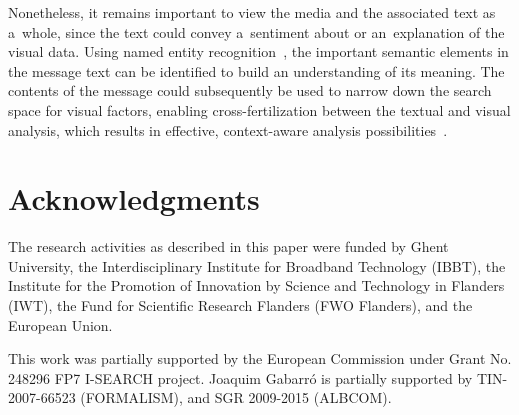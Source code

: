 \documentclass{acm_proc_article-sp}
\newcommand{\inlinelistingsize}{\fontsize{8pt}{11pt}}
\let\oldttdefault\ttdefault
\renewcommand{\ttdefault}{pcr}
\let\oldurl\url
\renewcommand{\url}[1]{\inlinelistingsize\oldurl{#1}}
\begin{document}
Nonetheless, it remains important to view the media and the associated text as a~whole,
since the text could convey a~sentiment about or an~explanation of the visual data.
Using named entity recognition~\cite{NERD,AddingMeaningToMicroposts}, the important semantic elements in the message text can be identified to build an understanding of its meaning.
The contents of the message could subsequently be used to narrow down the search space for visual factors, enabling cross-fertilization between the textual and visual analysis, which results in effective, context-aware analysis possibilities~\cite{verborgh_mtap_2011}.

\section*{Acknowledgments}
The research activities as described in this paper were funded by Ghent University, the Interdisciplinary Institute for Broadband Technology (IBBT), the Institute for the Promotion of Innovation by Science and Technology in Flanders (IWT), the Fund for Scientific Research Flanders (FWO Flanders), and the European Union.

This work was partially supported by the European Commission under Grant No. 248296 FP7 \mbox{I-SEARCH} project.
Joaquim Gabarr\'o is partially supported by TIN-2007-66523 (FORMALISM), and SGR 2009-2015 (\mbox{ALBCOM}).

\let\ttdefault\oldttdefault
\let\url\oldurl




\balancecolumns
\end{document}
